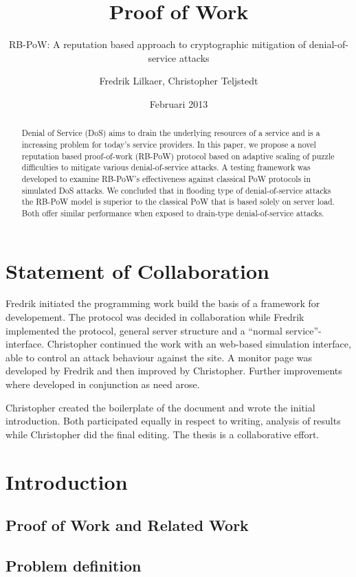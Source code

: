 \documentclass[a4paper,11pt]{kth-mag}
\title{Proof of Work}
\subtitle{RB-PoW: A reputation based approach to cryptographic mitigation of denial-of-service attacks}
\author{Fredrik Lilkaer, Christopher Teljstedt}
\date{Februari 2013}
\begin{document}
\removepagenumbers
\maketitle 
{}
\newpage
\begin{abstract}
Denial of Service (DoS) aims to drain the underlying resources of a service and is a increasing problem for today's service providers. In this paper, we propose a novel reputation based proof-of-work (RB-PoW)  protocol based on adaptive scaling of puzzle difficulties to mitigate various denial-of-service attacks. A testing framework was developed to examine RB-PoW's effectiveness against classical PoW protocols in simulated DoS attacks. We concluded that in flooding type of denial-of-service attacks the RB-PoW model is superior to the classical PoW that is based solely on server load. Both offer similar performance when exposed to drain-type denial-of-service attacks. 
\end{abstract} 
\newpage
\section*{Statement of Collaboration} 
Fredrik initiated the programming work build the basis of a framework for developement. The protocol was decided in collaboration while Fredrik implemented the protocol, general server structure and a ``normal service''- interface.
Christopher continued the work with an web-based simulation interface, able to control an attack behaviour against the site. A monitor page was developed by Fredrik and then improved by Christopher. Further improvements where developed in conjunction as need arose.

Christopher created the boilerplate of the document and wrote the initial introduction.
Both participated equally in respect to writing, analysis of results while Christopher did the final editing. The thesis is a collaborative effort.
\newpage  
\setcounter{section}{0}
\tableofcontents
\newpage
\section{Introduction}

\subsection*{Proof of Work and Related Work}

\subsection*{Problem definition}

\end{document}
